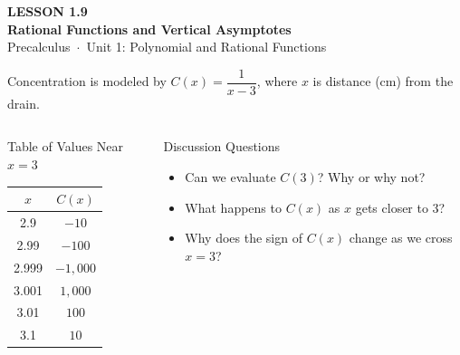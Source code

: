 \documentclass[aspectratio=169, 11pt]{beamer}
\begin{document}
{
\begin{frame}[plain]
  \vspace{2.8cm}\hspace{0.55cm}%
  \begin{minipage}{0.9\textwidth}
    {\color{goldacc}\bfseries\small LESSON 1.9}\\[0.5cm]
    {\color{white}\bfseries\LARGE Rational Functions and Vertical Asymptotes}\\[1.2cm]
    {\color{skymid}\small Precalculus~$\cdot$~Unit 1: Polynomial and Rational Functions}
  \end{minipage}
\end{frame}
}

\begin{frame}[t, plain]

  Concentration is modeled by $C(x) = \dfrac{1}{x - 3}$, where $x$ is distance (cm) from the drain.

  \bigskip
  \begin{columns}[T]
      \begin{block}{Table of Values Near $x = 3$}
        \renewcommand{\arraystretch}{1.3}
        \begin{tabular}{|c|c|}
        \hline
        $x$    & $C(x)$ \\
        \hline
        2.9    & $-10$ \\
        2.99   & $-100$ \\
        2.999  & $-1{,}000$ \\
        3.001  & $1{,}000$ \\
        3.01   & $100$ \\
        3.1    & $10$ \\
        \hline
        \end{tabular}
      \end{block}

      \begin{block}{Discussion Questions}
        \begin{itemize}\setlength{\itemsep}{6pt}
          \item Can we evaluate $C(3)$? Why or why not?
          \item What happens to $C(x)$ as $x$ gets closer to 3?
          \item Why does the sign of $C(x)$ change as we cross $x = 3$?
        \end{itemize}
      \end{block}
  \end{columns}
\end{frame}
\end{document}
